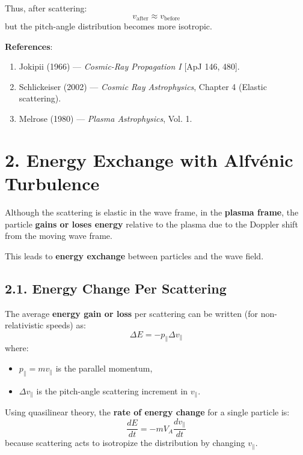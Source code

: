 Thus, after scattering:
\begin{equation}
\boxed{v_{\text{after}} \approx v_{\text{before}}}
\end{equation}
but the pitch-angle distribution becomes more isotropic.

\medskip
\noindent
\textbf{References}:
\begin{enumerate}
    \item Jokipii (1966) --- \textit{Cosmic-Ray Propagation I} [ApJ 146, 480].
    \item Schlickeiser (2002) --- \textit{Cosmic Ray Astrophysics}, Chapter 4 (Elastic scattering).
    \item Melrose (1980) --- \textit{Plasma Astrophysics}, Vol. 1.
\end{enumerate}

\hrulefill

\section*{\texorpdfstring{ \textbf{2. Energy Exchange with Alfvénic Turbulence}}{}}

Although the scattering is elastic in the wave frame, in the \textbf{plasma frame}, the particle \textbf{gains or loses energy} relative to the plasma due to the Doppler shift from the moving wave frame.

This leads to \textbf{energy exchange} between particles and the wave field.

\subsection*{2.1. \textbf{Energy Change Per Scattering}}

The average \textbf{energy gain or loss} per scattering can be written (for non-relativistic speeds) as:
\begin{equation}
\Delta E = - p_{\parallel} \Delta v_{\parallel}
\end{equation}
where:
\begin{itemize}
    \item $p_{\parallel} = m v_{\parallel}$ is the parallel momentum,
    \item $\Delta v_{\parallel}$ is the pitch-angle scattering increment in $v_{\parallel}$.
\end{itemize}

Using quasilinear theory, the \textbf{rate of energy change} for a single particle is:
\begin{equation}
\frac{dE}{dt} = - m V_A \frac{d v_{\parallel}}{dt}
\end{equation}
because scattering acts to isotropize the distribution by changing $v_{\parallel}$.

